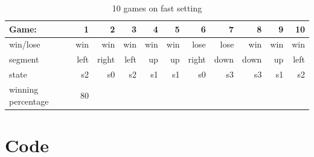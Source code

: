 \documentclass[11pt]{article}
\newcommand{\Verilog}[2][]{%
	
}
\begin{document}
\begin{table}[ht]\centering
	\caption{10 games on fast setting}
	\label{ALU:tbl:alu_ERT}\medskip
	\begin{tabular}{l|rrrrrrrrrr}
		Game: & 1 & 2 & 3 & 4 & 5 & 6 & 7 & 8 & 9 & 10 \\
		\midrule
		win/lose & win & win & win & win & win & lose & lose & win & win & win\\
		segment & left & right & left & up & up & right & down & down & up & left \\
		state & s2 & s0 & s2 & s1 & s1 & s0 & s3 & s3 & s1 & s2\\
		\midrule
		winning percentage & 80 &  &  &  &  & & & & &\\
		\bottomrule
	\end{tabular}
\end{table}

\section*{Code}

\Verilog{Lab11/systemverilog/guess_FSM.sv}

\Verilog{Lab11/systemverilog/guess_FSM_test.sv}

\Verilog{Lab11/systemverilog/guessing_game.sv}

\Verilog{Lab11/systemverilog/guessing_game_test.sv}
\end{document}
